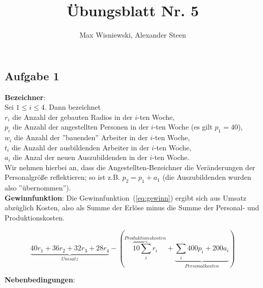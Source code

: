 \documentclass[11pt,a4paper,ngerman]{article}
\date{}
\title{Übungsblatt Nr. 5}
\author{Max Wisniewski, Alexander Steen}
\begin{document}
\renewcommand{\figurename}{Figure}
\maketitle
\thispagestyle{fancy}


\subsection*{Aufgabe 1}

\textbf{Bezeichner}:\\
Sei $1 \leq i \leq 4$. Dann bezeichnet \\
$r_i$ die Anzahl der gebauten Radios in der $i$-ten Woche,\\
$p_i$ die Anzahl der angestellten Personen in der $i$-ten Woche (es gilt $p_1 = 40$), \\
$w_i$ die Anzahl der ''bauenden'' Arbeiter in der $i$-ten Woche, \\
$t_i$ die Anzahl der ausbildenden Arbeiter in der $i$-ten Woche, \\
$a_i$ die Anzal der neuen Auszubildenden in der $i$-ten Woche. \\

Wir nehmen hierbei an, dass die Angestellten-Bezeichner die Veränderungen der Personalgröße reflektieren; so ist z.B. $p_2 = p_1 + a_1$ (die Auszubildenden wurden also ''übernommen''). \\

\textbf{Gewinnfunktion}: Die Gewinnfunktion~(\ref{eq:gewinn}) ergibt sich aus Umsatz abzüglich Kosten, also als Summe der Erlöse minus die Summe der Personal- und Produktionskosten. 

\begin{equation}\label{eq:gewinn}
 \underbrace{40r_1 + 36r_2 + 32r_3 + 28r_4}_{Umsatz} - \left(\overbrace{10\sum_i r_i}^{Produktionskosten}
 + \underbrace{\sum_i 400p_i + 200a_i}_{Personalkosten} \right)
\end{equation}

\textbf{Nebenbedingungen}: \\
\end{document}
